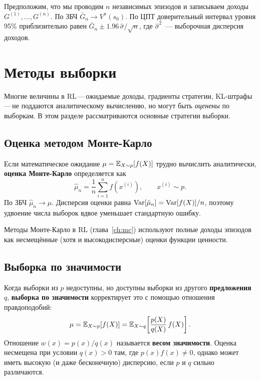 \begin{example}
Предположим, что мы проводим $n$ независимых эпизодов и записываем доходы $G^{(1)}, \ldots, G^{(n)}$. По ЗБЧ $\bar{G}_n \to V^\pi(s_0)$. По ЦПТ доверительный интервал уровня 95\% приблизительно равен $\bar{G}_n \pm 1.96\,\hat{\sigma}/\sqrt{n}$, где $\hat{\sigma}^2$~--- выборочная дисперсия доходов.
\end{example}

\section{Методы выборки}
\label{app:sampling}

Многие величины в RL\,---\,ожидаемые доходы, градиенты стратегии, KL-штрафы\,---\,не поддаются аналитическому вычислению, но могут быть \emph{оценены} по выборкам. В этом разделе рассматриваются основные стратегии выборки.

\subsection*{Оценка методом Монте-Карло}

Если математическое ожидание $\mu = \operatorname{\mathbb{E}}_{X \sim p}[f(X)]$ трудно вычислить аналитически, \textbf{оценка Монте-Карло} определяется как
\[
    \hat{\mu}_n = \frac{1}{n}\sum_{i=1}^n f(x^{(i)}), \qquad
    x^{(i)} \sim p.
\]
По ЗБЧ $\hat{\mu}_n \to \mu$. Дисперсия оценки равна $\operatorname{Var}[\hat{\mu}_n] = \operatorname{Var}[f(X)] / n$, поэтому удвоение числа выборок вдвое уменьшает стандартную ошибку.

Методы Монте-Карло в RL (глава~\ref{ch:mc}) используют полные доходы эпизодов как несмещённые (хотя и высокодисперсные) оценки функции ценности.

\subsection*{Выборка по значимости}

Когда выборки из $p$ недоступны, но доступны выборки из другого \textbf{предложения} $q$, \textbf{выборка по значимости} корректирует это с помощью отношения правдоподобий:
\[
    \mu = \operatorname{\mathbb{E}}_{X \sim p}[f(X)]
        = \operatorname{\mathbb{E}}_{X \sim q}\!\left[\frac{p(X)}{q(X)}\,f(X)\right].
\]
Отношение $w(x) = p(x)/q(x)$ называется \textbf{весом значимости}. Оценка несмещена при условии $q(x) > 0$ там, где $p(x)f(x) \neq 0$, однако может иметь высокую (и даже бесконечную) дисперсию, если $p$ и $q$ сильно различаются.

